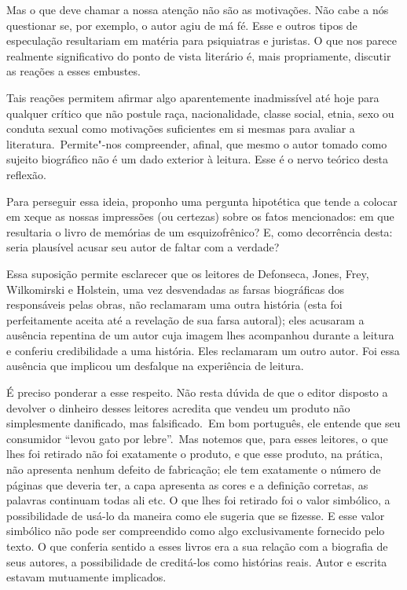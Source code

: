Mas o que deve chamar a nossa atenção não são as motivações. Não cabe a
nós questionar se, por exemplo, o autor agiu de má fé. Esse e outros
tipos de especulação resultariam em matéria para psiquiatras e juristas.
O que nos parece realmente significativo do ponto de vista literário é,
mais propriamente, discutir as reações a esses embustes.

Tais reações permitem afirmar algo aparentemente inadmissível até hoje
para qualquer crítico que não postule raça, nacionalidade, classe
social, etnia, sexo ou conduta sexual como motivações suficientes em si
mesmas para avaliar a literatura.~Permite"-nos compreender, afinal, que
mesmo o autor tomado como sujeito biográfico não é um dado exterior à
leitura. Esse é o nervo teórico desta reflexão.

Para perseguir essa ideia, proponho uma pergunta hipotética que tende a
colocar em xeque as nossas impressões (ou certezas) sobre os fatos
mencionados: em que resultaria o livro de memórias de um esquizofrênico?
E, como decorrência desta: seria plausível acusar seu autor de faltar
com a verdade?

Essa suposição permite esclarecer que os leitores de Defonseca, Jones,
Frey, Wilkomirski e Holstein, uma vez desvendadas as farsas biográficas dos responsáveis pelas obras, não reclamaram uma outra história (esta
foi perfeitamente aceita até a revelação de sua farsa autoral); eles
acusaram a ausência repentina de um autor cuja imagem lhes acompanhou
durante a leitura e conferiu credibilidade a uma história. Eles
reclamaram um outro autor. Foi essa ausência que implicou um desfalque
na experiência de leitura.

É preciso ponderar a esse respeito. Não resta dúvida de que o editor
disposto a devolver o dinheiro desses leitores acredita que vendeu um
produto não simplesmente danificado, mas falsificado.~Em bom português,
ele entende que seu consumidor ``levou gato por lebre''.~Mas notemos
que, para esses leitores, o que lhes foi retirado não foi exatamente o
produto, e que esse produto, na prática, não apresenta nenhum defeito de
fabricação; ele tem exatamente o número de páginas que deveria ter, a
capa apresenta as cores e a definição corretas, as palavras continuam
todas ali etc. O que lhes foi retirado foi o valor simbólico, a
possibilidade de usá-lo da maneira como ele sugeria que se fizesse. E
esse valor simbólico não pode ser compreendido como algo exclusivamente
fornecido pelo texto. O que conferia sentido a esses livros era a sua
relação com a biografia de seus autores, a possibilidade de creditá-los
como histórias reais. Autor e escrita estavam mutuamente implicados.

